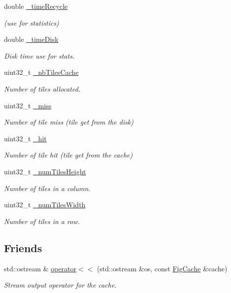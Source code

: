 \begin{DoxyCompactItemize}
double \hyperlink{classfi_1_1FigCache_aaeaaa4e96d4753da663ed5eb123f266d}{\+\_\+time\+Recycle}
\begin{DoxyCompactList}\small\item\em (use for statistics) \end{DoxyCompactList}\item 
double \hyperlink{classfi_1_1FigCache_af12e09bb66ab9be647c888e1040d5eef}{\+\_\+time\+Disk}
\begin{DoxyCompactList}\small\item\em Disk time use for stats. \end{DoxyCompactList}\item 
uint32\+\_\+t \hyperlink{classfi_1_1FigCache_a3f766e4fd7a57c10d0bfa3ba6c4bbdb2}{\+\_\+nb\+Tiles\+Cache}
\begin{DoxyCompactList}\small\item\em Number of tiles allocated. \end{DoxyCompactList}\item 
uint32\+\_\+t \hyperlink{classfi_1_1FigCache_a6d215bd51e4ace7e12b34ee6c573af5b}{\+\_\+miss}
\begin{DoxyCompactList}\small\item\em Number of tile miss (tile get from the disk) \end{DoxyCompactList}\item 
uint32\+\_\+t \hyperlink{classfi_1_1FigCache_abf3763839280072304e2c9d83467307b}{\+\_\+hit}
\begin{DoxyCompactList}\small\item\em Number of tile hit (tile get from the cache) \end{DoxyCompactList}\item 
uint32\+\_\+t \hyperlink{classfi_1_1FigCache_a7abe64041794cdaf6daa4760830cfcf3}{\+\_\+num\+Tiles\+Height}
\begin{DoxyCompactList}\small\item\em Number of tiles in a column. \end{DoxyCompactList}\item 
uint32\+\_\+t \hyperlink{classfi_1_1FigCache_a7bad6e0aef83aeb7dcf8bf9ea74d445c}{\+\_\+num\+Tiles\+Width}
\begin{DoxyCompactList}\small\item\em Number of tiles in a row. \end{DoxyCompactList}\end{DoxyCompactItemize}
\subsection*{Friends}
\begin{DoxyCompactItemize}
\item 
std\+::ostream \& \hyperlink{classfi_1_1FigCache_a512d75b86b892a2e9cf48d84b1e55c5c}{operator$<$$<$} (std\+::ostream \&os, const \hyperlink{classfi_1_1FigCache}{Fig\+Cache} \&cache)
\begin{DoxyCompactList}\small\item\em Stream output operator for the cache. \end{DoxyCompactList}\end{DoxyCompactItemize}


